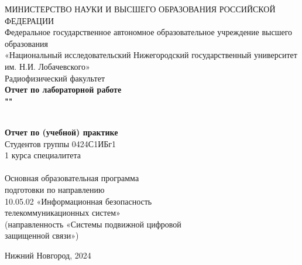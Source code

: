 
\begin{center}
	МИНИСТЕРСТВО НАУКИ И ВЫСШЕГО ОБРАЗОВАНИЯ РОССИЙСКОЙ
	ФЕДЕРАЦИИ\\
	
	\hfill \break
	Федеральное государственное автономное образовательное учреждение высшего образования \\«Национальный исследовательский Нижегородский государственный университет им. Н.И. Лобачевского» \\
	
	\hfill \break
	Радиофизический факультет\\
	\vspace{2.5cm}
	\large{\textbf{ Отчет по лабораторной работе \\ "\mytitle"}}\\
	\hfill \break
	\\
\end{center}

\vspace{0cm}

\begin{flushright}
	{\bf Отчет по (учебной) практике}\\
	Студентов группы 0424С1ИБг1\\
	1 курса специалитета\\
	\myauthor \\
	\hfill \break
	Основная образовательная программа\\
	подготовки по направлению\\
	10.05.02 «Информационная безопасность\\ 
	телекоммуникационных систем»\\
	(направленность «Системы подвижной цифровой\\
	защищенной связи»)
\end{flushright}

\vfill
\begin{center} Нижний Новгород, 2024 \end{center}
\thispagestyle{empty}
\newpage
